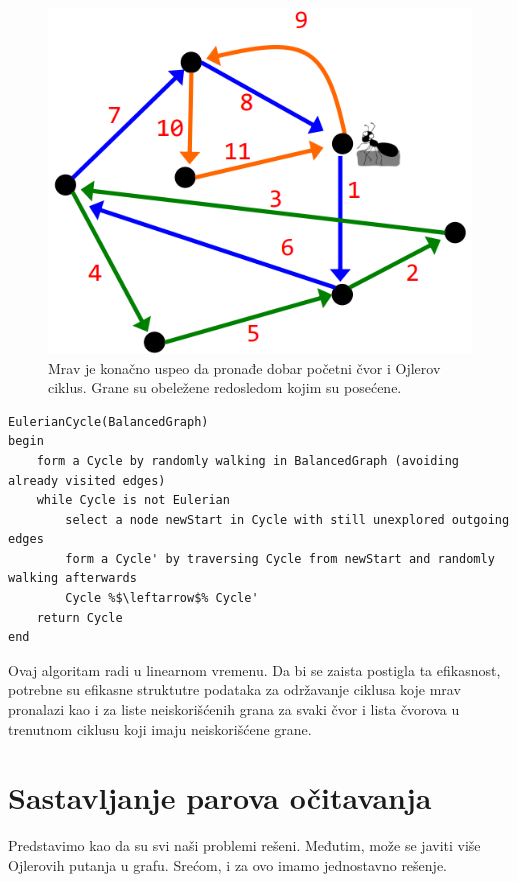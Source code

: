 \begin{minipage}{\textwidth}
\begin{minipage}{0.45\textwidth}
\begin{figure}[H]
			\includegraphics[width=\textwidth]{poglavlja/3/slike/mrav4.png}
			\caption{Mrav je konačno uspeo da pronađe dobar početni čvor i Ojlerov ciklus. Grane su obeležene redosledom kojim su posećene.}
			\label{slika:mrav4}
		\end{figure} 
	\end{minipage}
	\vspace*{1em}
\end{minipage}

\begin{lstlisting}
EulerianCycle(BalancedGraph)
begin
	form a Cycle by randomly walking in BalancedGraph (avoiding already visited edges)
	while Cycle is not Eulerian
		select a node newStart in Cycle with still unexplored outgoing edges
		form a Cycle' by traversing Cycle from newStart and randomly walking afterwards
		Cycle %$\leftarrow$% Cycle'
	return Cycle
end
\end{lstlisting}

Ovaj algoritam radi u linearnom vremenu. Da bi se zaista postigla ta efikasnost, potrebne su efikasne struktutre podataka za održavanje ciklusa koje mrav pronalazi kao i za liste neiskorišćenih grana za svaki čvor i lista čvorova u trenutnom ciklusu koji imaju neiskorišćene grane.

\section{Sastavljanje parova očitavanja}

Predstavimo kao da su svi naši problemi rešeni. Međutim, može se javiti više Ojlerovih putanja u grafu. Srećom, i za ovo imamo jednostavno rešenje.

